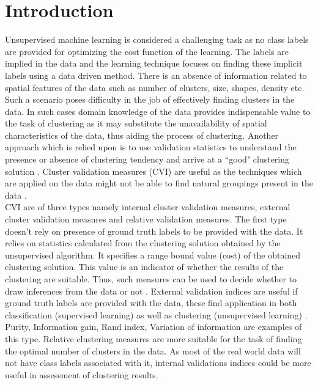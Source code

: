 \documentclass{svproc}
\begin{document}
\section{Introduction}
Unsupervised machine learning is considered a challenging task as no class labels are provided for optimizing the cost function of the learning. The labels are implied in the data and the learning technique focuses on finding these implicit labels using a data driven method. There is an absence of information related to spatial features of the data such as number of clusters, size, shapes, density etc. Such a scenario poses difficulty in the job of effectively finding clusters in the data. In such cases domain knowledge of the data provides indispensable value to the task of clustering as it may substitute the unavailability of spatial characteristics of the data, thus aiding the process of clustering. Another approach which is relied upon is to use validation statistics to understand the presence or absence of clustering tendency and arrive at a ``good" clustering solution \cite{ppr:1}. Cluster validation measures (CVI) are useful as the techniques which are applied on the data might not be able to find natural groupings present in the data \cite{ppr:2}.\\

CVI are of three types namely internal cluster validation measures, external cluster validation measures and relative validation measures. The first type doesn't rely on presence of ground truth labels to be provided with the data. It relies on statistics calculated from the clustering solution obtained by the unsupervised algorithm.  It specifies a range bound value (cost) of the obtained clustering solution. This value is an indicator of whether the results of the clustering are suitable. Thus, such measures can be used to decide whether to draw inferences from the data or not \cite{ppr:1} \cite{ppr:2}. External validation indices are useful if ground truth labels are provided with the data, these find application in both classification (supervised learning) as well as clustering (unsupervised learning) \cite{ppr:3}. Purity, Information gain, Rand index, Variation of information are examples of this type. Relative clustering measures are more suitable for the task of finding the optimal number of clusters in the data. As most of the real world data will not have class labels associated with it, internal validations indices could be more useful in assessment of clustering results.\\
\end{document}
